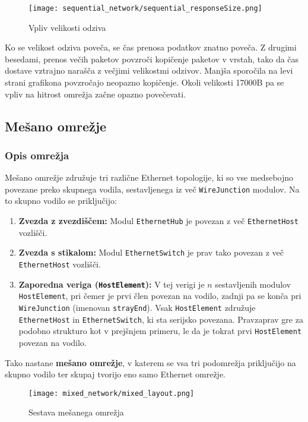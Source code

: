 \begin{figure}[H]
    \centering
    \texttt{[image: sequential\_network/sequential\_responseSize.png]}
    \caption{Vpliv velikosti odziva}
    \label{g05:fig:sequential-responseSize}
\end{figure}

Ko se velikost odziva poveča, se čas prenosa podatkov znatno poveča. Z drugimi besedami, prenos večih paketov povzroči kopičenje paketov v vrstah, tako da čas dostave vztrajno narašča z večjimi velikostmi odzivov. Manjša sporočila na levi strani grafikona povzročajo neopazno kopičenje. Okoli velikosti 17000B pa se vpliv na hitrost omrežja začne opazno povečevati.

\subsection{Mešano omrežje}

\subsubsection{Opis omrežja}

Mešano omrežje združuje tri različne Ethernet topologije, ki so vse medsebojno povezane preko skupnega vodila, sestavljenega iz več \texttt{WireJunction} modulov. Na to skupno vodilo se priključijo:
\begin{enumerate}
    \item \textbf{Zvezda z zvezdiščem:} Modul \texttt{EthernetHub} je povezan z več \texttt{EthernetHost} vozlišči.
    \item \textbf{Zvezda s stikalom:} Modul \texttt{EthernetSwitch} je prav tako povezan z več \texttt{EthernetHost} vozlišči.
    \item \textbf{Zaporedna veriga (\texttt{HostElement}):} V tej verigi je $n$ sestavljenih modulov \texttt{HostElement}, pri čemer je prvi člen povezan na vodilo, zadnji pa se konča pri \texttt{WireJunction} (imenovan \texttt{strayEnd}). Vsak \texttt{HostElement} združuje \texttt{EthernetHost} in \texttt{EthernetSwitch}, ki sta serijsko povezana. Pravzaprav gre za podobno strukturo kot v prejšnjem primeru, le da je tokrat prvi \texttt{HostElement} povezan na vodilo.
\end{enumerate}

\noindent
Tako nastane \textbf{mešano omrežje}, v katerem se vsa tri podomrežja priključijo na skupno vodilo ter skupaj tvorijo eno samo Ethernet omrežje.

\begin{figure}[H]
    \centering
    \texttt{[image: mixed\_network/mixed\_layout.png]}
    \caption{Sestava mešanega omrežja}
    \label{g05:fig:mixed-layout}
\end{figure}

